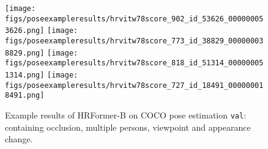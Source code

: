 \documentclass{article}
\begin{document}
\begin{figure*}[t]
  \centering
  \texttt{[image: figs/poseexampleresults/hrvitw78score\_902\_id\_53626\_000000053626.png]}
  \texttt{[image: figs/poseexampleresults/hrvitw78score\_773\_id\_38829\_000000038829.png]}
  \texttt{[image: figs/poseexampleresults/hrvitw78score\_818\_id\_51314\_000000051314.png]}
  \texttt{[image: figs/poseexampleresults/hrvitw78score\_727\_id\_18491\_000000018491.png]}
  \vspace{-0mm}
  \caption{{Example results of HRFormer-B on COCO pose estimation \texttt{val}: containing occlusion, multiple persons, viewpoint and appearance change.}}
  \label{fig:coco_pose_example}
  \vspace{-0mm}
\end{figure*}
\end{document}
